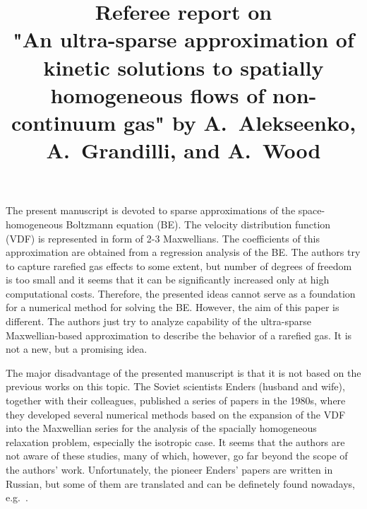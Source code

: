 \documentclass[11pt]{article}
\title{Referee report on \\
"An ultra-sparse approximation of kinetic solutions to spatially homogeneous flows of non-continuum gas"
by A.~Alekseenko, A.~Grandilli, and A.~Wood}
\date{}
\begin{document}
\maketitle

The present manuscript is devoted to sparse approximations of the space-homogeneous Boltzmann equation (BE).
The velocity distribution function (VDF) is represented in form of 2-3 Max\-wellians.
The coefficients of this approximation are obtained from a regression analysis of the BE.
The authors try to capture rarefied gas effects to some extent, but number of degrees of freedom is too small
and it seems that it can be significantly increased only at high computational costs.
Therefore, the presented ideas cannot serve as a foundation for a numerical method for solving the BE.
However, the aim of this paper is different.
The authors just try to analyze capability of the ultra-sparse Maxwellian-based approximation
to describe the behavior of a rarefied gas. It is not a new, but a promising idea.

The major disadvantage of the presented manuscript is that it is not based on the previous works on this topic.
The Soviet scientists Enders (husband and wife), together with their colleagues, published a series of papers in the 1980s,
where they developed several numerical methods based on the expansion of the VDF into the Maxwellian series
for the analysis of the spacially homogeneous relaxation problem, especially the isotropic case.
It seems that the authors are not aware of these studies,
many of which, however, go far beyond the scope of the authors' work.
Unfortunately, the pioneer Enders' papers are written in Russian, but some of them are translated
and can be definetely found nowadays, e.g.~\cite{Ender1988}.
\end{document}
